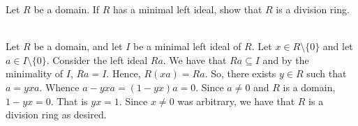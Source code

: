 Let $R$ be a domain. If $R$ has a minimal left ideal, show that $R$ is a division ring.\\

\begin{solution}\renewcommand{\qedsymbol}{}\ \\
    Let $R$ be a domain, and let $I$ be a minimal left ideal of $R$. Let $x\in R\setminus\{0\}$ and let
    $a\in I\setminus\{0\}$. Consider the left ideal $Ra$. We have that $Ra\subseteq I$ and by the
    minimality of $I$, $Ra=I$. Hence, $R(xa)=Ra$. So, there exists $y\in R$ such that $a=yxa$. Whence
    $a-yxa=(1-yx)a=0$. Since $a\neq0$ and $R$ is a domain, $1-yx=0$. That is $yx=1$. Since $x\neq0$ was
    arbitrary, we have that $R$ is a division ring as desired.

\end{solution}